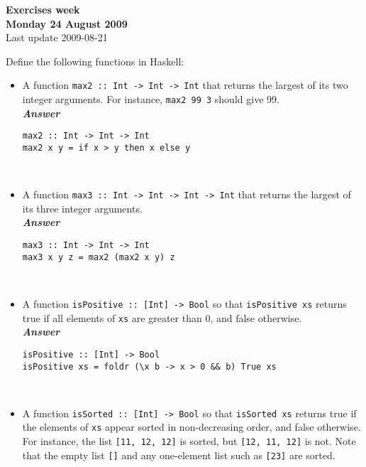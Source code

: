 \documentclass[a4paper]{article}
\begin{document}
\begin{center}
{\Large\bf Exercises week \\[1ex]
Monday 24 August 2009}\\[1ex]
{\small Last update 2009-08-21}\\[2ex]
\end{center}


\begin{exercise}\label{exer-fsharp-functions}
  Define the following functions in Haskell:

\begin{itemize}
\item A function \texttt{max2 ::\ Int -> Int -> Int} that returns the
  largest of its two integer arguments.  For instance, \texttt{max2 99
    3} should give 99.\\
  
\noindent
\textbf{\emph{Answer}}    
{\codesetup\begin{verbatim}
max2 :: Int -> Int -> Int
max2 x y = if x > y then x else y
\end{verbatim}}\\
  
\item A function \texttt{max3 ::\ Int -> Int -> Int -> Int} that returns
  the largest of its three integer arguments.\\
    
\noindent
\textbf{\emph{Answer}}
{\codesetup\begin{verbatim}
max3 :: Int -> Int -> Int
max3 x y z = max2 (max2 x y) z
\end{verbatim}}\\
  
\item A function \texttt{isPositive ::\ [Int] -> Bool} so that
  \texttt{isPositive xs} returns true if all elements of \texttt{xs}
  are greater than 0, and false otherwise.\\
    
\noindent
\textbf{\emph{Answer}}
{\codesetup\begin{verbatim}
isPositive :: [Int] -> Bool
isPositive xs = foldr (\x b -> x > 0 && b) True xs
\end{verbatim}}\\
  
\item A function \texttt{isSorted ::\ [Int] -> Bool} so that
  \texttt{isSorted xs} returns true if the elements of \texttt{xs}
  appear sorted in non-decreasing order, and false otherwise.  For
  instance, the list \texttt{[11, 12, 12]} is sorted, but \texttt{[12,
    11, 12]} is not.  Note that the empty list \texttt{[]} and any
  one-element list such as \texttt{[23]} are sorted.\\
    

\end{itemize}
\end{exercise}
\end{document}
